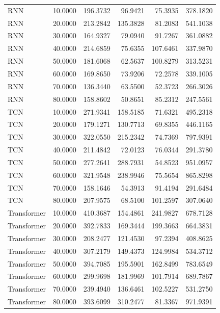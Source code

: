 \begin{tabular}{lrrrrr}
RNN & 10.0000 & 196.3732 & 96.9421 & 75.3935 & 378.1820 \\
RNN & 20.0000 & 213.2842 & 135.3828 & 81.2083 & 541.1038 \\
RNN & 30.0000 & 164.9327 & 79.0940 & 91.7267 & 361.0882 \\
RNN & 40.0000 & 214.6859 & 75.6355 & 107.6461 & 337.9870 \\
RNN & 50.0000 & 181.6068 & 62.5637 & 100.8279 & 313.5231 \\
RNN & 60.0000 & 169.8650 & 73.9206 & 72.2578 & 339.1005 \\
RNN & 70.0000 & 136.3440 & 63.5500 & 52.3723 & 266.3026 \\
RNN & 80.0000 & 158.8602 & 50.8651 & 85.2312 & 247.5561 \\
TCN & 10.0000 & 271.9341 & 158.5185 & 71.6321 & 495.2318 \\
TCN & 20.0000 & 179.1271 & 130.7713 & 69.8355 & 446.1165 \\
TCN & 30.0000 & 322.0550 & 215.2342 & 74.7369 & 797.9391 \\
TCN & 40.0000 & 211.4842 & 72.0123 & 76.0344 & 291.3780 \\
TCN & 50.0000 & 277.2641 & 288.7931 & 54.8523 & 951.0957 \\
TCN & 60.0000 & 321.9548 & 238.9946 & 75.5654 & 865.8298 \\
TCN & 70.0000 & 158.1646 & 54.3913 & 91.4194 & 291.6484 \\
TCN & 80.0000 & 207.9575 & 68.5100 & 101.2597 & 307.0640 \\
Transformer & 10.0000 & 410.3687 & 154.4861 & 241.9827 & 678.7128 \\
Transformer & 20.0000 & 392.7833 & 169.3444 & 199.3663 & 664.3831 \\
Transformer & 30.0000 & 208.2477 & 121.4530 & 97.2394 & 408.8625 \\
Transformer & 40.0000 & 307.2179 & 149.4373 & 124.9984 & 534.3712 \\
Transformer & 50.0000 & 394.7085 & 195.5901 & 162.8499 & 783.6549 \\
Transformer & 60.0000 & 299.9698 & 181.9969 & 101.7914 & 689.7867 \\
Transformer & 70.0000 & 239.4940 & 136.6461 & 102.5227 & 531.2750 \\
Transformer & 80.0000 & 393.6099 & 310.2477 & 81.3367 & 971.9391 \\
\bottomrule
\end{tabular}
